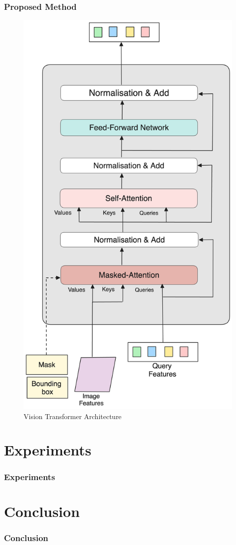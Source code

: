 \documentclass{beamer}
\begin{document}
\begin{frame}
  \frametitle{Proposed Method}
  \begin{figure}[h!]
    \centering
    \includegraphics[scale=0.065]{Figures/emamt-decoder.png}
    \caption{Vision Transformer Architecture}
    \label{fig:proposed-model-Transformer}
  \end{figure}
\end{frame}

\section{Experiments}
\begin{frame}
  \frametitle{Experiments}
\end{frame}

\section{Conclusion}
\begin{frame}
  \frametitle{Conclusion}
\end{frame}
\end{document}

